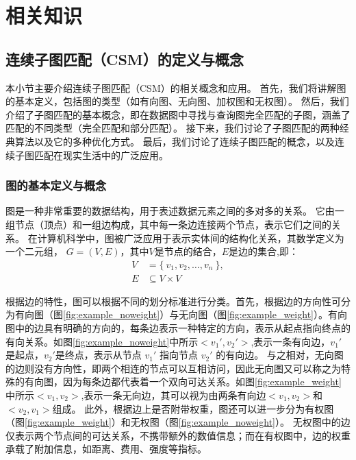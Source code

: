 \chapter{相关知识}

\section{连续子图匹配（CSM）的定义与概念}
本小节主要介绍连续子图匹配（CSM）的相关概念和应用。
首先，我们将讲解图的基本定义，包括图的类型（如有向图、无向图、加权图和无权图）。
然后，我们介绍了子图匹配的基本概念，即在数据图中寻找与查询图完全匹配的子图，涵盖了匹配的不同类型（完全匹配和部分匹配）。
接下来，我们讨论了子图匹配的两种经典算法以及它的多种优化方式。
最后，我们讨论了连续子图匹配的概念，以及连续子图匹配在现实生活中的广泛应用。
\subsection{图的基本定义与概念}
图是一种非常重要的数据结构，用于表述数据元素之间的多对多的关系。
它由一组节点（顶点）和一组边构成，其中每一条边连接两个节点，表示它们之间的关系。
在计算机科学中，图被广泛应用于表示实体间的结构化关系，其数学定义为一个二元组，
$G=(V,E)$，其中$V$是节点的结合，$E$是边的集合,即：
\begin{align*}
  V &= \{\ v_1, v_2, \dots, v_n\ \},\\
  E &\subseteq V \times V
\end{align*}

根据边的特性，图可以根据不同的划分标准进行分类。首先，根据边的方向性可分为有向图（图\ref{fig:example_noweight}）与无向图（图\ref{fig:example_weight}）。有向图中的边具有明确的方向的，每条边表示一种特定的方向，表示从起点指向终点的有向关系。如图\ref{fig:example_noweight}中所示$<v_1',v_2'>$,表示一条有向边，$v_1'$是起点，$v_2'$是终点，表示从节点 $v_1'$ 指向节点 $v_2'$ 的有向边。
与之相对，无向图的边则没有方向性，即两个相连的节点可以互相访问，因此无向图又可以称之为特殊的有向图，因为每条边都代表着一个双向可达关系。如图\ref{fig:example_weight}中所示$<v_1,v_2>$,表示一条无向边，其可以视为由两条有向边$<v_1,v_2>$和$<v_2,v_1>$组成。
此外，根据边上是否附带权重，图还可以进一步分为有权图（图\ref{fig:example_weight}）和无权图（图\ref{fig:example_noweight}）。
无权图中的边仅表示两个节点间的可达关系，不携带额外的数值信息；而在有权图中，边的权重承载了附加信息，如距离、费用、强度等指标。

